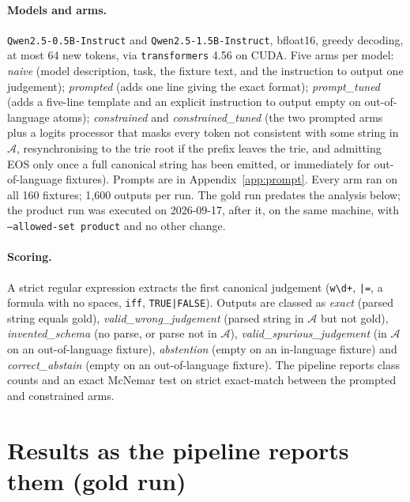 \documentclass[11pt]{article}
\begin{document}
\paragraph{Models and arms.} \texttt{Qwen2.5-0.5B-Instruct} and \texttt{Qwen2.5-1.5B-Instruct}, bfloat16, greedy decoding, at most 64 new tokens, via \texttt{transformers} 4.56 on CUDA. Five arms per model: \emph{naive} (model description, task, the fixture text, and the instruction to output one judgement); \emph{prompted} (adds one line giving the exact format); \emph{prompt\_tuned} (adds a five-line template and an explicit instruction to output empty on out-of-language atoms); \emph{constrained} and \emph{constrained\_tuned} (the two prompted arms plus a logits processor that masks every token not consistent with some string in $\mathcal{A}$, resynchronising to the trie root if the prefix leaves the trie, and admitting EOS only once a full canonical string has been emitted, or immediately for out-of-language fixtures). Prompts are in Appendix~\ref{app:prompt}. Every arm ran on all 160 fixtures; 1,600 outputs per run. The gold run predates the analysis below; the product run was executed on 2026-09-17, after it, on the same machine, with \texttt{--allowed-set product} and no other change.

\paragraph{Scoring.} A strict regular expression extracts the first canonical judgement (\texttt{w\textbackslash d+}, \texttt{|=}, a formula with no spaces, \texttt{iff}, \texttt{TRUE|FALSE}). Outputs are classed as \emph{exact} (parsed string equals gold), \emph{valid\_wrong\_judgement} (parsed string in $\mathcal{A}$ but not gold), \emph{invented\_schema} (no parse, or parse not in $\mathcal{A}$), \emph{valid\_spurious\_judgement} (in $\mathcal{A}$ on an out-of-language fixture), \emph{abstention} (empty on an in-language fixture) and \emph{correct\_abstain} (empty on an out-of-language fixture). The pipeline reports class counts and an exact McNemar test on strict exact-match between the prompted and constrained arms.

\section{Results as the pipeline reports them (gold run)}
\label{sec:primary}
\end{document}
